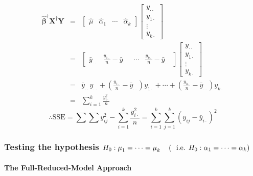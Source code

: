 \documentclass{article}
\begin{document}
\begin{eqnarray*}
\mathbf{\hat{\beta}}^{\dagger }\mathbf{X}^{\dagger }\mathbf{Y} &=&\left[ 
\begin{array}{cccc}
\hat{\mu} & \hat{\alpha}_{1} & \cdots & \hat{\alpha}_{k}%
\end{array}%
\right] \left[ 
\begin{array}{c}
y_{\cdot \cdot } \\ 
y_{1\cdot } \\ 
\vdots \\ 
y_{k\cdot }%
\end{array}%
\right] \\
&=&\left[ 
\begin{array}{cccc}
\bar{y}_{\cdot \cdot } & \frac{y_{1\cdot }}{n}-\bar{y}_{\cdot \cdot } & 
\cdots & \frac{y_{k\cdot }}{n}-\bar{y}_{\cdot \cdot }%
\end{array}%
\right] \left[ 
\begin{array}{c}
y_{\cdot \cdot } \\ 
y_{1\cdot } \\ 
\vdots \\ 
y_{k\cdot }%
\end{array}%
\right] \\
&=&\bar{y}_{\cdot \cdot }y_{\cdot \cdot }+\left( \frac{y_{1\cdot }}{n}-\bar{y%
}_{\cdot \cdot }\right) y_{1\cdot }+\cdots +\left( \frac{y_{k\cdot }}{n}-%
\bar{y}_{\cdot \cdot }\right) y_{k\cdot } \\
&=&\sum\limits_{i=1}^{k}\frac{y_{i\cdot }^{2}}{n}
\end{eqnarray*}%
\begin{equation*}
\therefore \text{SSE}=\sum \sum y_{ij}^{2}-\sum_{i=1}^{k}\frac{y_{i\cdot
}^{2}}{n}=\sum_{i=1}^{k}\sum_{j=1}^{k}\left( y_{ij}-\bar{y}_{i\cdot }\right)
^{2}
\end{equation*}

\bigskip

\subsubsection{Testing the hypothesis $H_{0}:\protect\mu _{1}=\cdots =%
\protect\mu _{k}\quad \left( \text{i.e. }H_{0}:\protect\alpha _{1}=\cdots =%
\protect\alpha _{k}\right) $}

\paragraph{The Full-Reduced-Model Approach}
\end{document}

